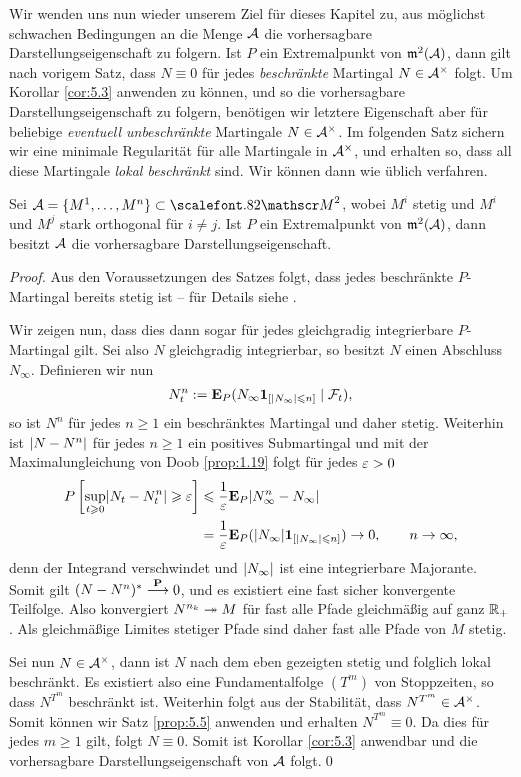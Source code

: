 Wir wenden uns nun wieder unserem Ziel für dieses Kapitel zu, aus möglichst
schwachen Bedingungen an die Menge $\AA$ die vorhersagbare
Darstellungseigenschaft zu folgern. Ist $P$ ein Extremalpunkt von $\m^2(\AA)$,
dann gilt nach vorigem Satz, dass $N\equiv 0$ für jedes \textit{beschränkte}
Martingal $N\in\AA^\times$ folgt. Um Korollar \ref{cor:5.3} anwenden
zu können, und so die vorhersagbare Darstellungseigenschaft zu folgern,
benötigen wir letztere Eigenschaft aber für beliebige \textit{eventuell
unbeschränkte} Martingale $N\in\AA^\times$. Im folgenden Satz sichern
wir eine minimale Regularität für alle Martingale in $\AA^\times$, und erhalten so,
dass all diese Martingale \textit{lokal beschränkt} sind. Wir können dann wie
üblich verfahren.

\begin{theorem}
\label{prop:5.6}
Sei $\AA = \setd{M^1,\ldots,M^n} \subset\MM^2$, wobei $M^i$ stetig und $M^i$
und $M^j$ stark orthogonal für $i\neq j$. Ist $P$ ein Extremalpunkt von
$\m^2(\AA)$, dann besitzt $\AA$ die vorhersagbare Darstellungseigenschaft.\fish
\end{theorem}
\begin{proof}
Aus den Voraussetzungen des Satzes folgt, dass jedes beschränkte
$P$-Martingal bereits stetig ist -- für Details
siehe \cite[Theorem 40, p. 186]{Protter:2004wfa}.

Wir zeigen nun, dass dies dann sogar für jedes gleichgradig integrierbare
$P$-Martingal gilt. Sei also $N$ gleichgradig integrierbar, so 
besitzt $N$ einen Abschluss $N_\infty$.
Definieren wir nun
\begin{align*}
N_t^n \defl \E_P(N_\infty\Id_{[\abs{N_\infty} \le n]}\mid \FF_t),
\end{align*}
so ist $N^n$ für jedes $n\ge 1$ ein beschränktes Martingal und daher stetig.
Weiterhin ist $\abs{N-N^n}$ für jedes $n\ge 1$ ein positives Submartingal und
mit der Maximalungleichung von Doob \ref{prop:1.19} folgt für jedes $\ep > 0$
\begin{align*}
P\left[ \sup_{t\ge 0} \abs{N_t-N_t^n}\ge \ep\right]
&\le \frac{1}{\ep} \E_P\abs{N_\infty^n - N_\infty}\\
&= 
\frac{1}{\ep} \E_P(\abs{N_\infty}\Id_{[\abs{N_\infty} \le n]}) \to 0,\qquad n\to
\infty,
\end{align*}
denn der Integrand verschwindet und $\abs{N_\infty}$ ist eine integrierbare
Majorante. Somit gilt $(N-N^n)^* \Pto 0$, und es existiert eine fast sicher
konvergente Teilfolge. Also konvergiert $N^{n_k}\unito M$ für fast alle Pfade
gleichmäßig auf ganz $\R_+$. Als gleichmäßige Limites stetiger Pfade sind
daher fast alle Pfade von $M$ stetig.

Sei nun $N\in\AA^\times$, dann ist $N$ nach dem eben gezeigten stetig und
folglich lokal beschränkt. Es existiert also eine Fundamentalfolge $(T^m)$ von
Stoppzeiten, so dass $N^{T^m}$ beschränkt ist. Weiterhin folgt aus der
Stabilität, dass $N^{T^m}\in\AA^\times$. Somit können wir Satz \ref{prop:5.5}
anwenden und erhalten $N^{T^m}\equiv 0$. Da dies für jedes $m\ge 1$ gilt, folgt
$N\equiv 0$. Somit ist Korollar \ref{cor:5.3} anwendbar und die vorhersagbare
Darstellungseigenschaft von $\AA$ folgt.\qed
\end{proof}

